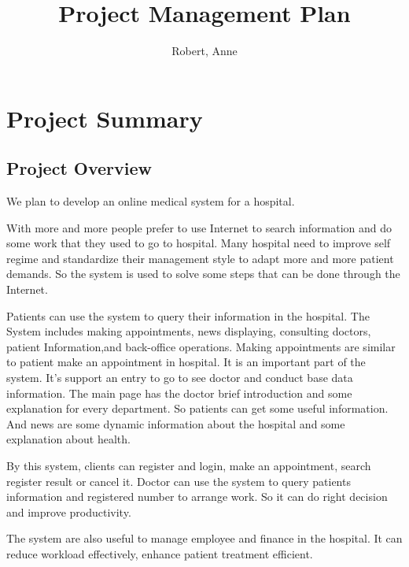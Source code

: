 \documentclass[a4paper,11pt]{article}
\title{Project Management Plan}
\author{Robert, Anne}
\begin{document}
\maketitle
\tableofcontents

\clearpage

\section{Project Summary}
\subsection{Project Overview}

We plan to develop an online medical system for a hospital.

With more and more people prefer to use Internet to search information and do some work that they used to go to hospital.
Many hospital need to improve self regime and standardize their management style to adapt more and more patient demands.
So the system is used to solve some steps that can be done through the Internet.

Patients can use the system to query their information in the hospital. 
The System includes making appointments, news displaying, consulting doctors, patient Information,and back-office operations.
Making appointments are similar to patient make an appointment in hospital. 
It is an important part of the system. 
It's support an entry to go to see doctor and conduct base data information. 
The main page has the doctor brief introduction and some explanation for every department. 
So patients can get some useful information. 
And news are some dynamic information about the hospital and some explanation about health. 

By this system, clients can register and login, make an appointment, search register result or cancel it.
Doctor can use the system to query patients information and registered number to arrange work.
So it can do right decision and improve productivity. 

The system are also useful to manage employee and finance in the hospital. 
It can reduce workload effectively, enhance patient treatment efficient.
\end{document}
